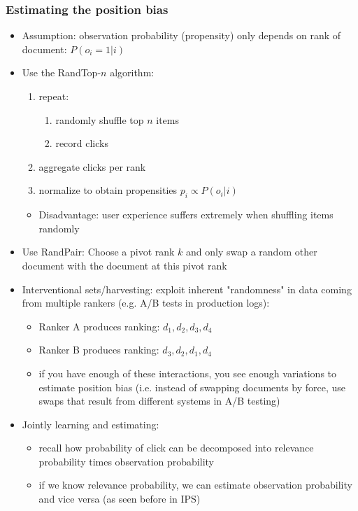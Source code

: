 \subsubsection{Estimating the position bias}
\begin{itemize}
	\item Assumption: observation probability (propensity) only depends on rank of document: $P(o_i = 1|i)$
	\item Use the RandTop-$n$ algorithm:
	\begin{enumerate}
		\item repeat:
		\begin{enumerate}
			\item randomly shuffle top $n$ items
			\item record clicks
		\end{enumerate}
		\item aggregate clicks per rank
		\item normalize to obtain propensities $p_i \propto P(o_i|i)$
	\end{enumerate}
	\begin{itemize}
		\item Disadvantage: user experience suffers extremely when shuffling items randomly
	\end{itemize}
	\item Use RandPair: Choose a pivot rank $k$ and only swap a random other document with the document at this pivot rank
	\item Interventional sets/harvesting: exploit inherent "randomness" in data coming from multiple rankers (e.g. A/B tests in production logs):
	\begin{itemize}
		\item Ranker A produces ranking: $d_1,d_2,d_3,d_4$
		\item Ranker B produces ranking: $d_3,d_2,d_1,d_4$
		\item if you have enough of these interactions, you see enough variations to estimate position bias (i.e. instead of swapping documents by force, use swaps that result from different systems in A/B testing)
	\end{itemize}
	\item Jointly learning and estimating:
	\begin{itemize}
		\item recall how probability of click can be decomposed into relevance probability times observation probability
		\item if we know relevance probability, we can estimate observation probability and vice versa (as seen before in IPS)

\end{itemize}
\end{itemize}
